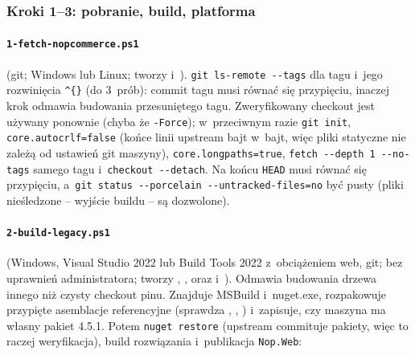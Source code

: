 
\subsubsection{Kroki 1--3: pobranie, build, platforma}\label{sec:bench-krok1}

\paragraph{\texttt{1-fetch-nopcommerce.ps1}} (git; Windows lub Linux; tworzy
 i~). \texttt{git ls-remote -{}-tags} dla tagu
i~jego rozwinięcia \texttt{\textasciicircum\{\}} (do 3~prób): commit tagu musi równać się
przypięciu, inaczej krok odmawia budowania przesuniętego tagu. Zweryfikowany checkout
jest używany ponownie (chyba że \texttt{-Force}); w~przeciwnym razie \texttt{git init},
\texttt{core.autocrlf=false} (końce linii upstream bajt w~bajt, więc pliki statyczne nie
zależą od ustawień git maszyny), \texttt{core.longpaths=true}, \texttt{fetch -{}-depth 1
-{}-no-tags} samego tagu i~\texttt{checkout -{}-detach}. Na końcu \texttt{HEAD} musi równać
się przypięciu, a~\texttt{git status -{}-porcelain -{}-untracked-files=no} być pusty (pliki
nieśledzone -- wyjście buildu -- są dozwolone).

\paragraph{\texttt{2-build-legacy.ps1}} (Windows, Visual Studio 2022 lub Build Tools
2022 z~obciążeniem web, git; bez uprawnień administratora; tworzy
, ,  oraz
 i~). Odmawia budowania drzewa innego niż
czysty checkout pinu. Znajduje MSBuild i~nuget.exe, rozpakowuje przypięte asemblacje
referencyjne (sprawdza , ,
) i~zapisuje, czy maszyna ma własny pakiet 4.5.1.
Potem \texttt{nuget restore} (upstream commituje pakiety, więc to raczej weryfikacja),
build rozwiązania i~publikacja \texttt{Nop.Web}:

